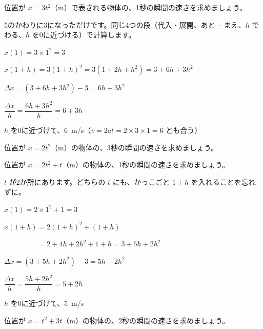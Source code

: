 \begin{reidai}[ちがう式の運動]
位置が $x=3t^2$（m）で表される物体の、1秒の瞬間の速さを求めましょう。\par
\kangaekata 5のかわりに3になっただけです。同じ4つの段（代入・展開、あと${}-{}$まえ、$h$ でわる、$h$ を0に近づける）で計算します。\par
\shiki $x(1)=3\times1^2=3$\par
\hspace*{2.6\zw}$x(1+h)=3(1+h)^2=3(1+2h+h^2)=3+6h+3h^2$\par
\hspace*{2.6\zw}$\Delta x=(3+6h+3h^2)-3=6h+3h^2$\par
\hspace*{2.6\zw}$\dfrac{\Delta x}{h}=\dfrac{6h+3h^2}{h}=6+3h$\par
\kotae $h$ を0に近づけて、\qty{6}{m/s}（$v=2at=2\times3\times1=6$ とも合う）
\end{reidai}

\begin{jibun}
位置が $x=2t^2$（m）の物体の、3秒の瞬間の速さを求めましょう。
\end{jibun}

\begin{reidai}[項が2つある式]
位置が $x=2t^2+t$（m）の物体の、1秒の瞬間の速さを求めましょう。\par
\kangaekata $t$ が2か所にあります。どちらの $t$ にも、かっこごと $1+h$ を入れることを忘れずに。\par
\shiki $x(1)=2\times1^2+1=3$\par
\hspace*{2.6\zw}$x(1+h)=2(1+h)^2+(1+h)$\par
\hspace*{2.6\zw}$\phantom{x(1+h)}=2+4h+2h^2+1+h=3+5h+2h^2$\par
\hspace*{2.6\zw}$\Delta x=(3+5h+2h^2)-3=5h+2h^2$\par
\hspace*{2.6\zw}$\dfrac{\Delta x}{h}=\dfrac{5h+2h^2}{h}=5+2h$\par
\kotae $h$ を0に近づけて、\qty{5}{m/s}
\end{reidai}

\begin{jibun}
位置が $x=t^2+3t$（m）の物体の、2秒の瞬間の速さを求めましょう。
\end{jibun}

